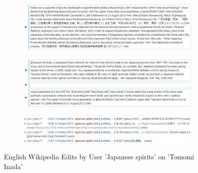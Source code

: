 \documentclass[10pt,british,A4paper,,openany]{memoir}
\begin{document}
\begin{figure}[!htb]
 \centering
 \begin{subfigure}[b]{0.9\textwidth}
  \includegraphics[width=\textwidth]{images/wiki/japanese-spirits-inada1.jpg}
 \end{subfigure}
 \begin{subfigure}[b]{0.9\textwidth}
  \includegraphics[width=\textwidth]{images/wiki/japanese-spirits-inada2.jpg}
 \end{subfigure}
 \begin{subfigure}[b]{0.9\textwidth}
  \includegraphics[width=\textwidth]{images/wiki/japanese-spirits-inada0.jpg}
 \end{subfigure}
 \caption{English Wikipedia Edits by User 'Japanese spirits' on 'Tomomi Inada'}\label{fig:js-inada}
\end{figure}
\end{document}
